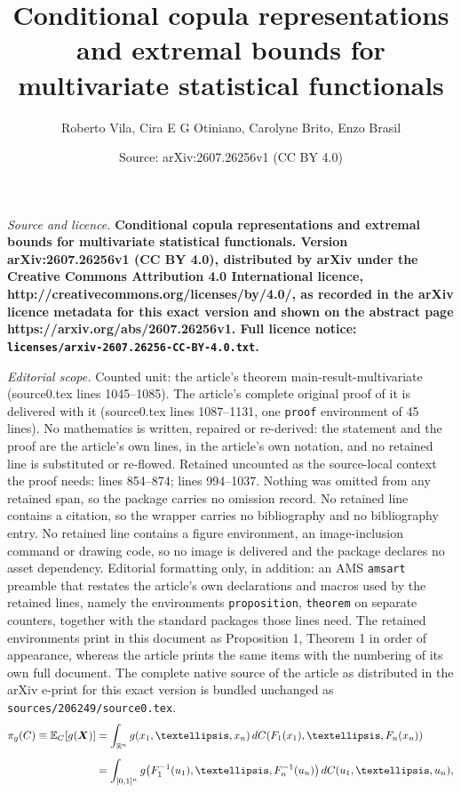 \documentclass[10pt,a4paper]{amsart}
\title{\bf Conditional copula representations and extremal bounds for multivariate statistical functionals}
\author{Roberto Vila, Cira E G Otiniano, Carolyne Brito, Enzo Brasil}
\date{Source: arXiv:2607.26256v1 (CC BY 4.0)}
\begin{document}
\maketitle

\noindent\emph{Source and licence.} \bf Conditional copula representations and extremal bounds for multivariate statistical functionals. Version arXiv:2607.26256v1 (CC BY 4.0), distributed by arXiv under the Creative Commons Attribution 4.0 International licence, http://creativecommons.org/licenses/by/4.0/, as recorded in the arXiv licence metadata for this exact version and shown on the abstract page https://arxiv.org/abs/2607.26256v1. Full licence notice: \texttt{licenses/arxiv-2607.26256-CC-BY-4.0.txt}.\par\smallskip

\noindent\textit{Editorial scope.} Counted unit: the article's theorem main-result-multivariate (source0.tex lines 1045--1085). The article's complete original proof of it is delivered with it (source0.tex lines 1087--1131, one \texttt{proof} environment of 45 lines). No mathematics is written, repaired or re-derived: the statement and the proof are the article's own lines, in the article's own notation, and no retained line is substituted or re-flowed.  Retained uncounted as the source-local context the proof needs: lines 854--874; lines 994--1037.  Nothing was omitted from any retained span, so the package carries no omission record.  No retained line contains a citation, so the wrapper carries no bibliography and no bibliography entry.  No retained line contains a figure environment, an image-inclusion command or drawing code, so no image is delivered and the package declares no asset dependency.  Editorial formatting only, in addition: an AMS \texttt{amsart} preamble that restates the article's own declarations and macros used by the retained lines, namely the environments \texttt{proposition}, \texttt{theorem} on separate counters, together with the standard packages those lines need.  The retained environments print in this document as Proposition 1, Theorem 1 in order of appearance, whereas the article prints the same items with the numbering of its own full document.  The complete native source of the article as distributed in the arXiv e-print for this exact version is bundled unchanged as \texttt{sources/206249/source0.tex}.
\begin{align}
	\pi_g(C)
	\equiv 
	\mathbb E_C[g(\boldsymbol X)]
	&=
	\int_{\mathbb R^n}
	g(x_1,\ldots,x_n)\,
	{\rm d}
	C\!\left(
	F_1(x_1),\ldots,F_n(x_n)
	\right)
	\nonumber
	\\[0.2cm]
	&=
	\int_{[0,1]^n}
	g\!\left(
	F_1^{-1}(u_1),\ldots,F_n^{-1}(u_n)
	\right)
	{\rm d}C(u_1,\ldots,u_n),
	\label{id-exp-cop}
\end{align}
\end{document}
